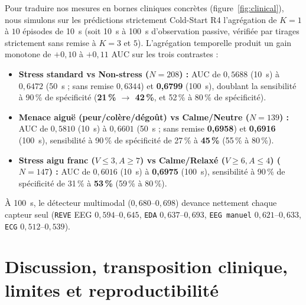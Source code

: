\documentclass[10pt]{article}
\begin{document}
Pour traduire nos mesures en bornes cliniques concrètes (figure~\ref{fig:clinical}), nous simulons sur les prédictions strictement Cold-Start R4 l'agrégation de $K = 1$ à $10$ épisodes de 10~s (soit 10~s à 100~s d'observation passive, vérifiée par tirages strictement sans remise à $K = 3$ et $5$). L'agrégation temporelle produit un gain monotone de $+0{,}10$ à $+0{,}11$ AUC sur les trois contrastes :
\begin{itemize}
\item \textbf{Stress standard vs Non-stress ($N = 208$) :} AUC de $0{,}5688$ (10~s) à $0{,}6472$ (50~s ; sans remise $0{,}6344$) et \textbf{0,6799} (100~s), doublant la sensibilité à 90\,\% de spécificité (\textbf{21\,\% $\to$ 42\,\%}, et 52\,\% à 80\,\% de spécificité).
\item \textbf{Menace aiguë (peur/colère/dégoût) vs Calme/Neutre ($N = 139$) :} AUC de $0{,}5810$ (10~s) à $0{,}6601$ (50~s ; sans remise \textbf{0,6958}) et \textbf{0,6916} (100~s), sensibilité à 90\,\% de spécificité de 27\,\% à \textbf{45\,\%} (55\,\% à 80\,\%).
\item \textbf{Stress aigu franc ($V\le 3, A\ge 7$) vs Calme/Relaxé ($V\ge 6, A\le 4$) ($N = 147$) :} AUC de $0{,}6016$ (10~s) à \textbf{0,6975} (100~s), sensibilité à 90\,\% de spécificité de 31\,\% à \textbf{53\,\%} (59\,\% à 80\,\%).
\end{itemize}
À 100~s, le détecteur multimodal ($0{,}680$--$0{,}698$) devance nettement chaque capteur seul (\texttt{REVE} EEG $0{,}594$--$0{,}645$, \texttt{EDA} $0{,}637$--$0{,}693$, \texttt{EEG manuel} $0{,}621$--$0{,}633$, \texttt{ECG} $0{,}512$--$0{,}539$).

\section{Discussion, transposition clinique, limites et reproductibilité}
\label{sec:discussion}
\end{document}
